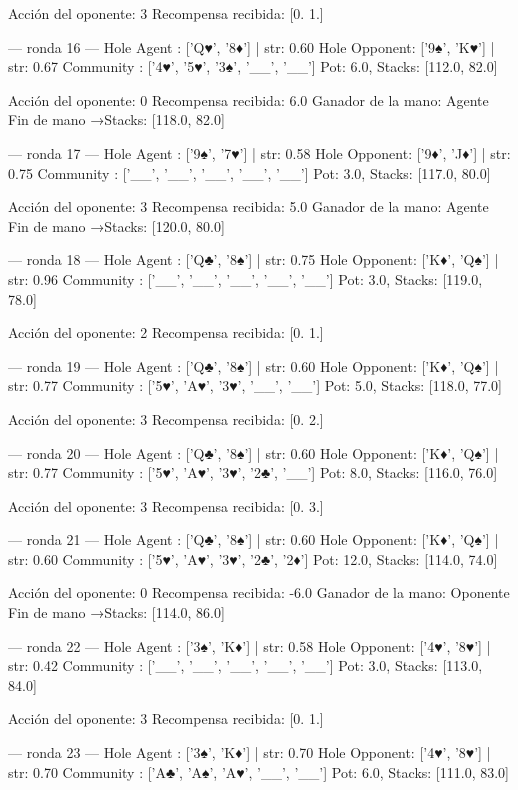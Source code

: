 Acción del oponente: 3
Recompensa recibida: [0. 1.]

--- ronda 16 ---
Hole Agent : ['Q♥', '8♦'] | str: 0.60
Hole Opponent: ['9♠', 'K♥'] | str: 0.67
Community  : ['4♥', '5♥', '3♠', '__', '__']
Pot: 6.0, Stacks: [112.0, 82.0]

Acción del oponente: 0
Recompensa recibida: 6.0
Ganador de la mano: Agente
Fin de mano →Stacks: [118.0, 82.0]


--- ronda 17 ---
Hole Agent : ['9♠', '7♥'] | str: 0.58
Hole Opponent: ['9♦', 'J♦'] | str: 0.75
Community  : ['__', '__', '__', '__', '__']
Pot: 3.0, Stacks: [117.0, 80.0]

Acción del oponente: 3
Recompensa recibida: 5.0
Ganador de la mano: Agente
Fin de mano →Stacks: [120.0, 80.0]


--- ronda 18 ---
Hole Agent : ['Q♣', '8♠'] | str: 0.75
Hole Opponent: ['K♦', 'Q♠'] | str: 0.96
Community  : ['__', '__', '__', '__', '__']
Pot: 3.0, Stacks: [119.0, 78.0]

Acción del oponente: 2
Recompensa recibida: [0. 1.]

--- ronda 19 ---
Hole Agent : ['Q♣', '8♠'] | str: 0.60
Hole Opponent: ['K♦', 'Q♠'] | str: 0.77
Community  : ['5♥', 'A♥', '3♥', '__', '__']
Pot: 5.0, Stacks: [118.0, 77.0]

Acción del oponente: 3
Recompensa recibida: [0. 2.]

--- ronda 20 ---
Hole Agent : ['Q♣', '8♠'] | str: 0.60
Hole Opponent: ['K♦', 'Q♠'] | str: 0.77
Community  : ['5♥', 'A♥', '3♥', '2♣', '__']
Pot: 8.0, Stacks: [116.0, 76.0]

Acción del oponente: 3
Recompensa recibida: [0. 3.]

--- ronda 21 ---
Hole Agent : ['Q♣', '8♠'] | str: 0.60
Hole Opponent: ['K♦', 'Q♠'] | str: 0.60
Community  : ['5♥', 'A♥', '3♥', '2♣', '2♦']
Pot: 12.0, Stacks: [114.0, 74.0]

Acción del oponente: 0
Recompensa recibida: -6.0
Ganador de la mano: Oponente
Fin de mano →Stacks: [114.0, 86.0]


--- ronda 22 ---
Hole Agent : ['3♠', 'K♦'] | str: 0.58
Hole Opponent: ['4♥', '8♥'] | str: 0.42
Community  : ['__', '__', '__', '__', '__']
Pot: 3.0, Stacks: [113.0, 84.0]

Acción del oponente: 3
Recompensa recibida: [0. 1.]

--- ronda 23 ---
Hole Agent : ['3♠', 'K♦'] | str: 0.70
Hole Opponent: ['4♥', '8♥'] | str: 0.70
Community  : ['A♣', 'A♠', 'A♥', '__', '__']
Pot: 6.0, Stacks: [111.0, 83.0]


